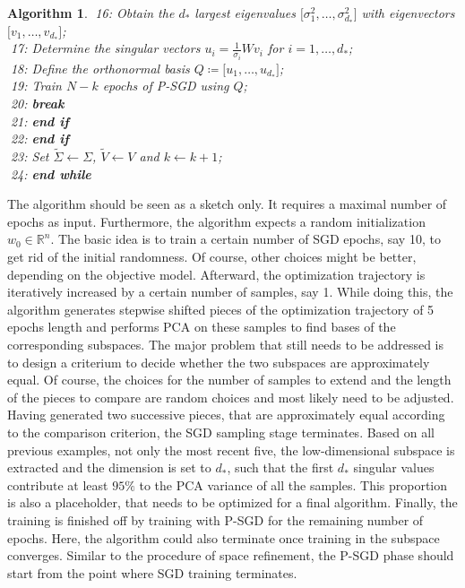 \documentclass[11pt, a4paper]{article}
\newtheorem{algorithm}[theorem]{Algorithm}
\newcommand{\R}{\mathbb{R}}
\begin{document}
\begin{algorithm}
\textcolor{white}{$\Big |$}16: \quad \quad \quad Obtain the $d_*$ largest eigenvalues $\big [\sigma_1^2, \dots, \sigma_{d_*}^2 \big ]$ with eigenvectors $ \big [v_1, \dots, v_{d_*} \big ]$; \\
\textcolor{white}{$\Big |$}17: \quad \quad \quad Determine the singular vectors $u_i = \frac{1}{\sigma_i}Wv_i$ for $i=1, \dots, d_*$; \\
\textcolor{white}{$\Big |$}18: \quad \quad \quad Define the orthonormal basis $Q \coloneq \big [u_1, \dots, u_{d_*} \big ]$; \\
\textcolor{white}{$\Big |$}19: \quad \quad \quad Train $N-k$ epochs of P-SGD using $Q$; \\
\textcolor{white}{$\Big |$}20: \quad \quad \quad \textbf{break} \\
\textcolor{white}{$\Big |$}21: \quad \quad \textbf{end if} \\
\textcolor{white}{$\Big |$}22: \quad \textbf{end if} \\
\textcolor{white}{$\Big |$}23: \quad Set $\tilde{\Sigma} \leftarrow \Sigma$, $\tilde{V} \leftarrow V$ and $k \leftarrow k+1$; \\
\textcolor{white}{$\Big |$}24: \textbf{end while} \\
\end{algorithm}

The algorithm should be seen as a sketch only. It requires a maximal number of epochs as input. Furthermore, the algorithm expects a random initialization $w_0 \in \R^n$. The basic idea is to train a certain number of SGD epochs, say 10, to get rid of the initial randomness. Of course, other choices might be better, depending on the objective model. Afterward, the optimization trajectory is iteratively increased by a certain number of samples, say 1. While doing this, the algorithm generates stepwise shifted pieces of the optimization trajectory of 5 epochs length and performs PCA on these samples to find bases of the corresponding subspaces. The major problem that still needs to be addressed is to design a criterium to decide whether the two subspaces are approximately equal. Of course, the choices for the number of samples to extend and the length of the pieces to compare are random choices and most likely need to be adjusted. Having generated two successive pieces, that are approximately equal according to the comparison criterion, the SGD sampling stage terminates. Based on all previous examples, not only the most recent five, the low-dimensional subspace is extracted and the dimension is set to $d_*$, such that the first $d_*$ singular values contribute at least $95\%$ to the PCA variance of all the samples. This proportion is also a placeholder, that needs to be optimized for a final algorithm. Finally, the training is finished off by training with P-SGD for the remaining number of epochs. Here, the algorithm could also terminate once training in the subspace converges. Similar to the procedure of space refinement, the P-SGD phase should start from the point where SGD training terminates. \\
\end{document}

